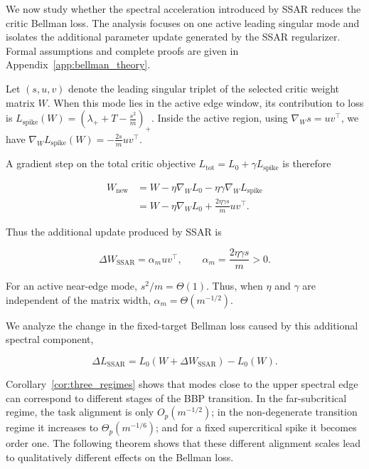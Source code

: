 We now study whether the spectral acceleration introduced by SSAR reduces the
critic Bellman loss. The analysis focuses on one active leading singular mode
and isolates the additional parameter update generated by the SSAR
regularizer. Formal assumptions and complete proofs are given in
Appendix~\ref{app:bellman_theory}.

Let $(s,u,v)$ denote the leading singular triplet of the selected critic
weight matrix $W$. When this mode lies in the active edge window,
its contribution to loss is $L_{\mathrm{spike}}(W)
=
\left(
\lambda_+ + T-\frac{s^2}{m}
\right)_+$. Inside the active region, using
$\nabla_W s=uv^\top$, we have $\nabla_W L_{\mathrm{spike}}(W)
=
-\frac{2s}{m}uv^\top.$


A gradient step on the total critic objective
$L_{\mathrm{tot}}=L_0+\gamma L_{\mathrm{spike}}$ is therefore

\begin{align}
W_{\mathrm{new}}
&=
W-\eta\nabla_WL_0
-\eta\gamma\nabla_WL_{\mathrm{spike}}
\nonumber\\
&=
W-\eta\nabla_WL_0
+
\frac{2\eta\gamma s}{m}uv^\top.
\label{eq:combined_update}
\end{align}

Thus the additional update produced by SSAR is

\begin{equation}
\Delta W_{\mathrm{SSAR}}
=
\alpha_m uv^\top,
\qquad
\alpha_m
=
\frac{2\eta\gamma s}{m}>0.
\label{eq:ssar_step}
\end{equation}

For an active near-edge mode, $s^2/m=\Theta(1)$. Thus, when $\eta$ and
$\gamma$ are independent of the matrix width,
$\alpha_m=\Theta(m^{-1/2})$.

We analyze the change in the fixed-target Bellman loss caused by this
additional spectral component,

\begin{equation}
\Delta L_{\mathrm{SSAR}}
=
L_0(W+\Delta W_{\mathrm{SSAR}})
-
L_0(W).
\label{eq:ssar_loss_change}
\end{equation}

Corollary~\ref{cor:three_regimes} shows that modes close to the upper spectral
edge can correspond to different stages of the BBP transition. In the
far-subcritical regime, the task alignment is only
$O_p(m^{-1/2})$; in the non-degenerate transition regime it increases to
$\Theta_p(m^{-1/6})$; and for a fixed supercritical spike it becomes
order one. The following theorem shows that these different alignment scales
lead to qualitatively different effects on the Bellman loss.


